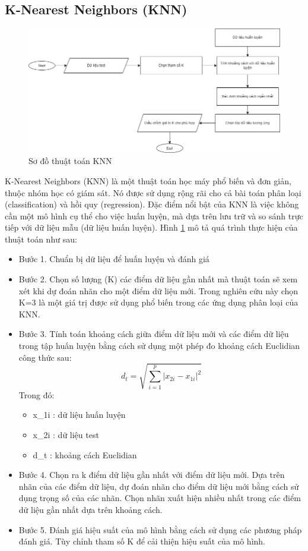 \documentclass[a4paper]{article}
\begin{document}
\subsection{K-Nearest Neighbors (KNN)}
\begin{figure}
    \centering
    \includegraphics[width=0.85\linewidth]{images/knn.png}
    \caption{Sơ đồ thuật toán KNN \cite{knn}}
    \label{fig:KNN}
\end{figure}
K-Nearest Neighbors (KNN) là một thuật toán học máy phổ biến và đơn giản, thuộc nhóm học có giám sát. Nó được sử dụng rộng rãi cho cả bài toán phân loại (classification) và hồi quy (regression). Đặc điểm nổi bật của KNN là việc không cần một mô hình cụ thể cho việc huấn luyện, mà dựa trên lưu trữ và so sánh trực tiếp với dữ liệu mẫu (dữ liệu huấn luyện). Hình \ref{fig:KNN} mô tả quá trình thực hiện của thuật toán như sau:
\begin{itemize}[label={}]
    \item Bước 1. Chuẩn bị dữ liệu để huấn luyện và đánh giá
    \item Bước 2. Chọn số lượng (K) các điểm dữ liệu gần nhất mà thuật toán sẽ xem xét khi dự đoán nhãn cho một điểm dữ liệu mới. Trong nghiên cứu này chọn K=3 là một giá trị được sử dụng phổ biến trong các ứng dụng phân loại của KNN. 
    \item Bước 3. Tính toán khoảng cách giữa điểm dữ liệu mới và các điểm dữ liệu trong tập huấn luyện bằng cách sử dụng một phép đo khoảng cách Euclidian công thức sau:
    \begin{equation}
        d_t = \sqrt{\sum_{i=1}^p |x_{2i} - x_{1i}|^2}
        \label{eq:euclidian}
    \end{equation}
    Trong đó: 
    \begin{itemize}[label={}]
        \item x\_1i : dữ liệu huấn luyện
        \item x\_2i : dữ liệu test
        \item d\_t  : khoảng cách Euclidian
    \end{itemize}
    \item Bước 4. Chọn ra k điểm dữ liệu gần nhất với điểm dữ liệu mới. Dựa trên nhãn của các điểm dữ liệu, dự đoán nhãn cho điểm dữ liệu mới bằng cách sử dụng trọng số của các nhãn. Chọn nhãn xuất hiện nhiều nhất trong các điểm dữ liệu gần nhất dựa trên khoảng cách. 
    \item Bước 5. Đánh giá hiệu suất của mô hình bằng cách sử dụng các phương pháp đánh giá. Tùy chỉnh tham số K để cải thiện hiệu suất của mô hình.
\end{itemize}
\end{document}
